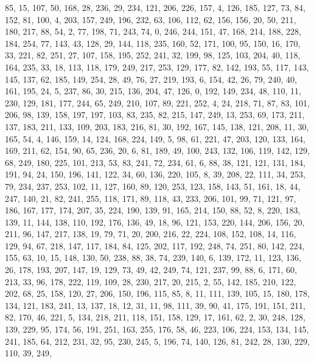 \begin{DoxyCode}
       85, 15, 107, 50, 168, 28, 236, 29, 234, 121, 206, 226, 157, 4, 126, 185, 127, 73, 84, 152, 81, 100, 4, 203,
       157, 249, 196, 232, 63, 106, 112, 62, 156, 156, 20, 50, 211, 180, 217, 88, 54, 2, 77, 198, 71, 243, 74, 0,
       246, 244, 151, 47, 168, 214, 188, 228, 184, 254, 77, 143, 43, 128, 29, 144, 118, 235, 160, 52, 171, 100, 95,
       150, 16, 170, 33, 221, 82, 251, 27, 107, 158, 195, 252, 241, 32, 199, 98, 125, 103, 204, 40, 118, 164, 235,
       33, 18, 113, 118, 179, 249, 217, 253, 129, 177, 82, 142, 193, 55, 117, 143, 145, 137, 62, 185, 149, 254,
       28, 49, 76, 27, 219, 193, 6, 154, 42, 26, 79, 240, 40, 161, 195, 24, 5, 237, 86, 30, 215, 136, 204, 47, 126,
       0, 192, 149, 234, 48, 110, 11, 230, 129, 181, 177, 244, 65, 249, 210, 107, 89, 221, 252, 4, 24, 218, 71, 87,
       83, 101, 206, 98, 139, 158, 197, 197, 103, 83, 235, 82, 215, 147, 249, 13, 253, 69, 173, 211, 137, 183, 211,
       133, 109, 203, 183, 216, 81, 30, 192, 167, 145, 138, 121, 208, 11, 30, 165, 54, 4, 146, 159, 14, 124, 168,
       224, 149, 5, 98, 61, 221, 47, 203, 120, 133, 164, 169, 211, 62, 154, 90, 65, 236, 20, 6, 81, 189, 49, 100,
       243, 132, 106, 119, 142, 129, 68, 249, 180, 225, 101, 213, 53, 83, 241, 72, 234, 61, 6, 88, 38, 121, 121,
       131, 184, 191, 94, 24, 150, 196, 141, 122, 34, 60, 136, 220, 105, 8, 39, 208, 22, 111, 34, 253, 79, 234, 237,
       253, 102, 11, 127, 160, 89, 120, 253, 123, 158, 143, 51, 161, 18, 44, 247, 140, 21, 82, 241, 255, 118, 171,
       89, 118, 43, 233, 206, 101, 99, 71, 121, 97, 186, 167, 177, 174, 207, 35, 224, 190, 139, 91, 165, 214, 150,
       88, 52, 8, 220, 183, 139, 11, 144, 138, 110, 192, 176, 136, 49, 18, 96, 121, 153, 220, 144, 206, 156, 20,
       211, 96, 147, 217, 138, 19, 79, 71, 20, 200, 216, 22, 224, 108, 152, 108, 14, 116, 129, 94, 67, 218, 147, 117,
       184, 84, 125, 202, 117, 192, 248, 74, 251, 80, 142, 224, 155, 63, 10, 15, 148, 130, 50, 238, 88, 38, 74,
       239, 140, 6, 139, 172, 11, 123, 136, 26, 178, 193, 207, 147, 19, 129, 73, 49, 42, 249, 74, 121, 237, 99, 88, 6,
       171, 60, 213, 33, 96, 178, 222, 119, 109, 28, 230, 217, 20, 215, 2, 55, 142, 185, 210, 122, 202, 68, 25,
       158, 120, 27, 206, 150, 196, 115, 85, 8, 11, 111, 139, 105, 15, 180, 178, 134, 121, 183, 241, 13, 137, 18, 12,
       31, 11, 98, 111, 39, 90, 41, 175, 191, 151, 211, 82, 170, 46, 221, 5, 134, 218, 211, 118, 151, 158, 129,
       17, 161, 62, 2, 30, 248, 128, 139, 229, 95, 174, 56, 191, 251, 163, 255, 176, 58, 46, 223, 106, 224, 153, 134,
       145, 241, 185, 64, 212, 231, 32, 95, 230, 245, 5, 196, 74, 140, 126, 81, 242, 28, 130, 229, 110, 39, 249,

\end{DoxyCode}
